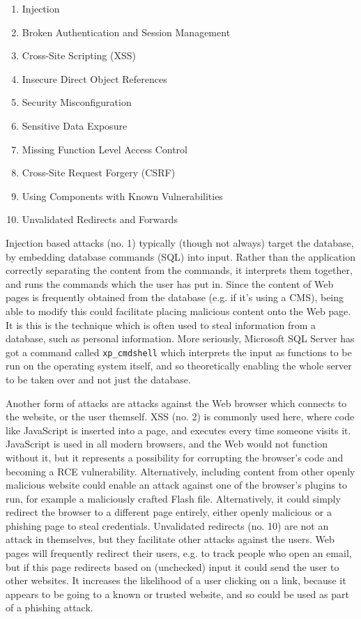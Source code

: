 \documentclass{acm_proc_article-sp}
\begin{document}
\begin{enumerate}
       \item Injection
       \item Broken Authentication and Session Management
       \item Cross-Site Scripting (XSS)
       \item Insecure Direct Object References
       \item Security Misconfiguration
       \item Sensitive Data Exposure
       \item Missing Function Level Access Control
       \item Cross-Site Request Forgery (CSRF)
       \item Using Components with Known Vulnerabilities
       \item Unvalidated Redirects and Forwards
\end{enumerate}

Injection based attacks (no. 1) typically (though not always) target the database, by embedding database commands (SQL) into input.  Rather than the application correctly separating the content from the commands, it interprets them together, and runs the commands which the user has put in.  Since the content of Web pages is frequently obtained from the database (e.g. if it's using a CMS), being able to modify this could facilitate placing malicious content onto the Web page.  It is this is the technique which is often used to steal information from a database, such as personal information.  More seriously, Microsoft SQL Server has got a command called \texttt{xp\_cmdshell} which interprets the input as functions to be run on the operating system itself, and so theoretically enabling the whole server to be taken over and not just the database.  

Another form of attacks are attacks against the Web browser which connects to the website, or the user themself.  XSS (no. 2) is commonly used here, where code like JavaScript is inserted into a page, and executes every time someone visits it.  JavaScript is used in all modern browsers, and the Web would not function without it, but it represents a possibility for corrupting the browser's code and becoming a RCE vulnerability.  Alternatively, including content from other openly malicious website could enable an attack against one of the browser's plugins to run, for example a maliciously crafted Flash file.  Alternatively, it could simply redirect the browser to a different page entirely, either openly malicious or a phishing page to steal credentials.  Unvalidated redirects (no. 10) are not an attack in themselves, but they facilitate other attacks against the users.  Web pages will frequently redirect their users, e.g. to track people who open an email, but if this page redirects based on (unchecked) input it could send the user to other websites.  It increases the likelihood of a user clicking on a link, because it appears to be going to a known or trusted website, and so could be used as part of a phishing attack.
\end{document}

